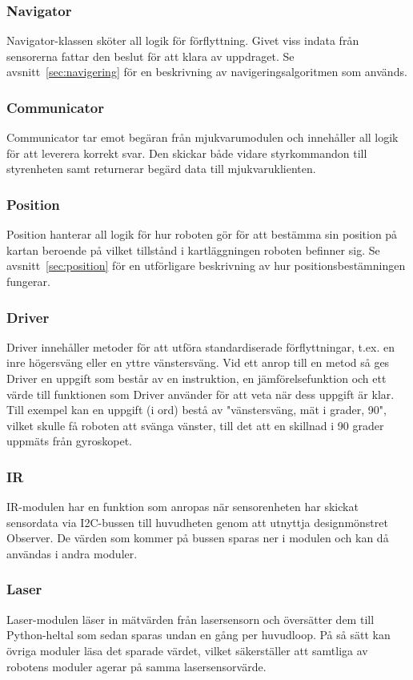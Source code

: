 \documentclass{article}
\begin{document}
\subsubsection{Navigator}
Navigator-klassen sköter all logik för förflyttning. Givet viss indata från sensorerna fattar den beslut för att klara av uppdraget. Se avsnitt~\ref{sec:navigering} för en beskrivning av navigeringsalgoritmen som används.

\subsubsection{Communicator}
Communicator tar emot begäran från mjukvarumodulen och innehåller all logik för att leverera korrekt svar. Den skickar både vidare styrkommandon till styrenheten samt returnerar begärd data till mjukvaruklienten. 

\subsubsection{Position}
Position hanterar all logik för hur roboten gör för att bestämma sin position på kartan beroende på vilket tillstånd i kartläggningen roboten befinner sig. Se avsnitt~\ref{sec:position} för en utförligare beskrivning av hur positionsbestämningen fungerar. 

\subsubsection{Driver}
Driver innehåller metoder för att utföra standardiserade förflyttningar, t.ex. en inre högersväng eller en yttre vänstersväng. Vid ett anrop till en metod så ges Driver en uppgift som består av en instruktion, en jämförelsefunktion och ett värde till funktionen som Driver använder för att veta när dess uppgift är klar. Till exempel kan en uppgift (i ord) bestå av "vänstersväng, mät i grader, 90", vilket skulle få roboten att svänga vänster, till det att en skillnad i 90 grader uppmäts från gyroskopet. 

\subsubsection{IR}
IR-modulen har en funktion som anropas när sensorenheten har skickat sensordata via I2C-bussen till huvudheten genom att utnyttja designmönstret Observer. De värden som kommer på bussen sparas ner i modulen och kan då användas i andra moduler.
\subsubsection{Laser}
Laser-modulen läser in mätvärden från lasersensorn och översätter dem till Python-heltal som sedan sparas undan en gång per huvudloop. På så sätt kan övriga moduler läsa det sparade värdet, vilket säkerställer att samtliga av robotens moduler agerar på samma lasersensorvärde.
\end{document}
